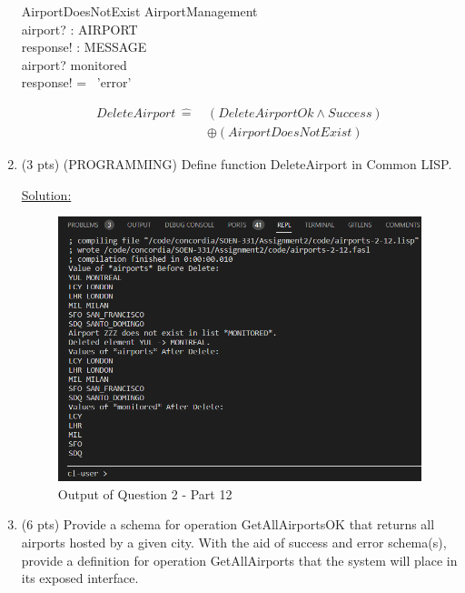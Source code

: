 \documentclass[12pt]{article}
\begin{document}
\begin{spacing}{1.5}
\begin{enumerate}
        \begin{schema}{AirportDoesNotExist}
            \Xi AirportManagement \\
            airport? : AIRPORT \\
            response! : MESSAGE \\
            \where
            airport? \notin monitored \\
            response! = \, 'error' \\
        \end{schema}
        \begin{align*}
            DeleteAirport \, \hat{=} \, &(DeleteAirportOk \land Success) \\
            &\oplus (AirportDoesNotExist)
        \end{align*}
        \newpage
        \item (3 pts) (PROGRAMMING) Define function DeleteAirport in Common LISP.
        
        \underline{Solution:}
        

        \begin{figure}[htp]
            \centering
            \includegraphics[width=1\textwidth]{static/airports-2-12.PNG}
            \caption{Output of Question 2 - Part 12}
        \end{figure}
        \newpage
        \item (6 pts) Provide a schema for operation GetAllAirportsOK that returns all airports
        hosted by a given city. With the aid of success and error schema(s), provide a definition
        for operation GetAllAirports that the system will place in its exposed interface.


\end{enumerate}
\end{spacing}
\end{document}
